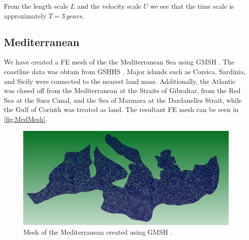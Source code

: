 From the length scale $L$ and the velocity scale $U$ we see that the time scale
is approximately $T = 3\, years$.

\subsection{Mediterranean}
We have created a FE mesh of the the Mediterranean Sea using GMSH \cite{GMSH}.
The coastline data was obtain from GSHHS \cite{GSHHS}. Major islands such as
Corsica, Sardinia, and Sicily were connected to the nearest land mass.
Additionally, the Atlantic was closed off from the Mediterranean at the Straits
of Gibraltar, from the Red Sea at the Suez Canal, and the Sea of Marmara at the
Dardanelles Strait, while the Gulf of Corinth was treated as land. The resultant FE
mesh can be seen in \autoref{fig:MedMesh}.

\begin{figure}
  \begin{center}
    \includegraphics[scale=0.75]{Figures/MediterraneanMesh.png}
    \caption{Mesh of the Mediterranean created using GMSH \cite{GMSH}.}
    \label{fig:MedMesh}
  \end{center}
\end{figure}

